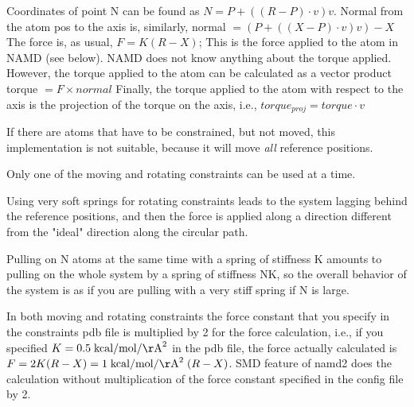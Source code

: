 Coordinates of point N can be found as
   $N = P + ( (R - P) \cdot v ) v$.
Normal from the atom pos to the axis is, similarly,
   normal $= ( P + ( (X - P) \cdot v ) v ) - X$
The force is, as usual,
   $F = K (R - X)$;
This is the force applied to the atom in NAMD (see below).
NAMD does not know anything about the torque
applied. However, the torque applied to the atom can be calculated
as a vector product
   torque $= F \times normal$
Finally, the torque applied to the atom with respect to the axis
is the projection of the torque on the axis, i.e.,
   $torque_{proj} = torque \cdot v$

If there are atoms that have to be constrained, but not moved,
this implementation is not suitable, because it will move {\em all}
reference positions.

Only one of the moving and rotating constraints can be used at a
time.

Using very soft springs for rotating constraints leads to the system
   lagging behind the reference positions, and then the force is applied
   along a direction different from the "ideal" direction along the
   circular path.

Pulling on N atoms at the same time with a spring of stiffness K
   amounts to pulling on the whole system by a spring of stiffness NK,
   so the overall behavior of the system is as if you are pulling with a
   very stiff spring if N is large.

In both moving and rotating constraints the force constant that you
   specify in the constraints pdb file is multiplied by 2 for the force
   calculation, i.e., if you specified $K = 0.5 \; {\rm kcal}/{\rm mol}/{\rm \AA}^2$ in the pdb
file,
   the force actually calculated is $F = 2 K (R-X) = 1 \; {\rm kcal}/{\rm mol}/{\rm \AA}^2 \; (R-X)$.
   SMD feature of namd2 does the calculation without multiplication of
the
   force constant specified in the config file by 2.


